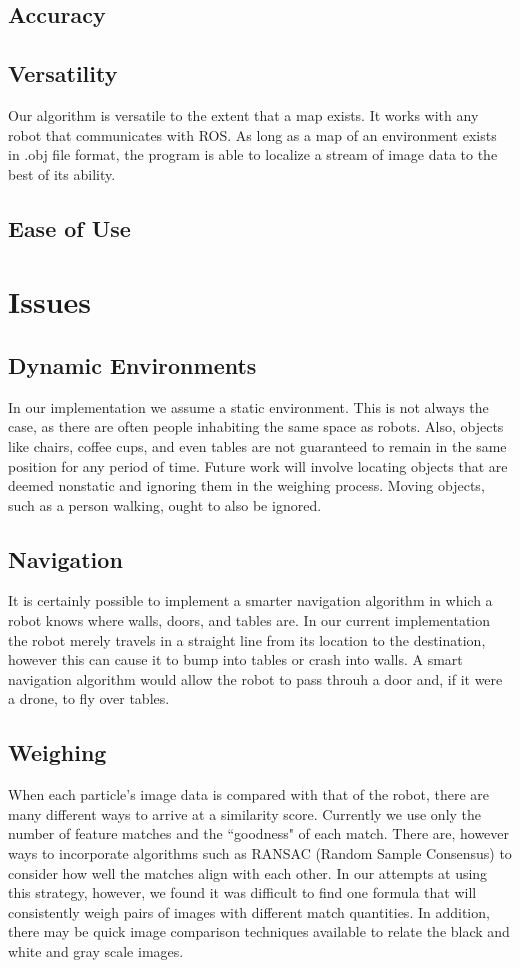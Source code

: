 \documentclass[a4paper,11pt]{article}
\begin{document}
\subsection{Accuracy}


\subsection{Versatility}
Our algorithm is versatile to the extent that a map exists. It works with any robot that communicates with ROS. As long as a map of an environment exists in .obj file format, the program is able to localize a stream of image data to the best of its ability.

\subsection{Ease of Use}


\section{Issues}
\subsection{Dynamic Environments}
In our implementation we assume a static environment. This is not always the case, as there are often people inhabiting the same space as robots. Also, objects like chairs, coffee cups, and even tables are not guaranteed to remain in the same position for any period of time. Future work will involve locating objects that are deemed nonstatic and ignoring them in the weighing process. Moving objects, such as a person walking, ought to also be ignored.

\subsection{Navigation}
It is certainly possible to implement a smarter navigation algorithm in which a robot knows where walls, doors, and tables are. In our current implementation the robot merely travels in a straight line from its location to the destination, however this can cause it to bump into tables or crash into walls. A smart navigation algorithm would allow the robot to pass throuh a door and, if it were a drone, to fly over tables.

\subsection{Weighing}
When each particle's image data is compared with that of the robot, there are many different ways to arrive at a similarity score. Currently we use only the number of feature matches and the ``goodness" of each match. There are, however ways to incorporate algorithms such as RANSAC (Random Sample Consensus) to consider how well the matches align with each other. In our attempts at using this strategy, however, we found it was difficult to find one formula that will consistently weigh pairs of images with different match quantities. In addition, there may be quick image comparison techniques available to relate the black and white and gray scale images.
\end{document}
